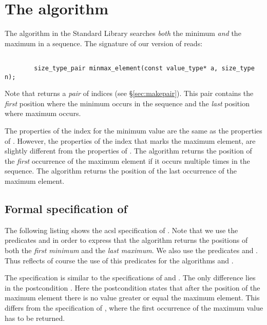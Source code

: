 
\section{The \minmaxelement algorithm}

The \minmaxelement algorithm in the
\cxx Standard Library \cite[\S 28.7.8]{cxx-17-draft} searches
\emph{both} the minimum \emph{and} the maximum in a sequence.
The signature of our version of \minelement reads:

\begin{lstlisting}[style = acsl-block]

        size_type_pair minmax_element(const value_type* a, size_type n);
\end{lstlisting}

Note that \minmaxelement returns a \emph{pair} of indices (see \S\ref{sec:makepair}).
This pair contains the \emph{first} position where the minimum occurs in
the sequence  and the \emph{last} position where maximum occurs.

The properties of the index for the minimum value are the same as the properties
of .
However, the properties of the index that marks the maximum
element, are slightly different from the properties of .
The \maxelement algorithm returns the position of the \emph{first} occurrence of
the maximum element if it occurs multiple times in the sequence. The
\minmaxelement algorithm returns the position of the last occurrence of the
maximum element.


\subsection{Formal specification of \minmaxelement}

The following listing shows the acsl specification of .
Note that we use the predicates  and
 in order to express that the algorithm returns
the positions of both the \emph{first minimum} and the \emph{last maximum}.
We also use the predicates  and .
Thus reflects of course the use of this predicates for the algorithms
 and .




The specification is similar to the specifications of \minelement and
\maxelement. The only difference lies in the postcondition . Here the
postcondition states that after the position of the maximum element there is no
value greater or equal the maximum element. This differs from the specification
of \maxelement, where the first occurrence of the maximum value has to be
returned.

